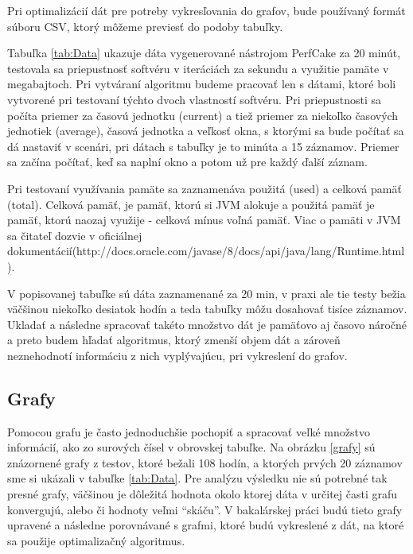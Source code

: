 Pri optimalizácií dát pre potreby vykresľovania do grafov, bude používaný formát súboru CSV, ktorý môžeme previesť do podoby tabuľky.

Tabuľka  \ref{tab:Data} ukazuje dáta vygenerované nástrojom PerfCake za 20 minút, testovala sa priepustnosť softvéru v iteráciách za sekundu a využitie pamäte v megabajtoch. Pri vytváraní algoritmu budeme pracovať len s dátami, ktoré boli vytvorené pri testovaní týchto dvoch vlastností softvéru. Pri priepustnosti sa počíta priemer za časovú jednotku (current) a tiež priemer za niekoľko časových jednotiek (average), časová jednotka a veľkosť okna, s ktorými sa bude počítať sa 
dá nastaviť v scenári, pri dátach s tabuľky je to minúta a 15 záznamov. Priemer sa začína počítať, keď sa naplní okno a potom už pre každý ďalší záznam. 

Pri testovaní využívania pamäte sa zaznamenáva použitá (used) a celková pamäť (total). Celková pamäť, je pamäť, ktorú si  JVM alokuje a použitá pamäť je pamäť, ktorú naozaj využije - celková mínus voľná pamäť. Viac o pamäti v JVM sa čitateľ dozvie v oficiálnej dokumentácií(http://docs.oracle.com/javase/8/docs/api/java/lang/Runtime.html).

V popisovanej tabuľke sú dáta zaznamenané za 20 min, v praxi ale tie testy bežia väčšinou niekoľko desiatok hodín a teda tabuľky môžu dosahovať tisíce záznamov. Ukladať a následne spracovať takéto množstvo dát je pamäťovo aj časovo náročné a preto budem hľadať algoritmus, ktorý zmenší objem dát a zároveň neznehodnotí informáciu z nich vyplývajúcu, pri vykreslení do grafov.


\subsection{Grafy}

Pomocou grafu je často jednoduchšie pochopiť a spracovať veľké množstvo informácií, ako zo surových čísel v obrovskej tabuľke. 
Na obrázku  \ref{grafy} sú znázornené grafy z testov, ktoré bežali 108 hodín, a ktorých prvých 20 záznamov sme si ukázali v tabuľke  \ref{tab:Data}. Pre analýzu výsledku nie sú potrebné tak presné grafy, väčšinou je dôležitá hodnota okolo ktorej dáta v určitej časti grafu konvergujú, alebo či hodnoty veľmi ``skáču''. V bakalárskej práci budú tieto grafy upravené a následne porovnávané s grafmi, ktoré budú vykreslené z dát, na ktoré sa použije optimalizačný algoritmus.




